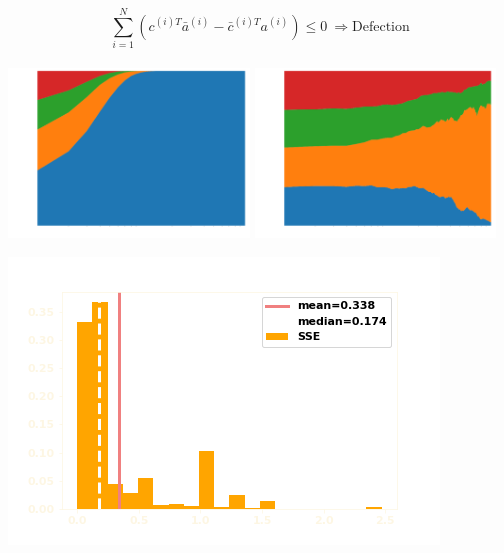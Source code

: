 \documentclass{beamer}
\begin{document}
\begin{frame}
    \begin{center}
    \[\sum_{i=1} ^ N (c^{(i)T} \bar{a}^{(i)} - \bar{c}^{(i)T} a^{(i)}) \leq 0 \ \Rightarrow \text{Defection}\] \\ \vspace{.5cm}
    \pause
    \includegraphics[width=0.48\textwidth]{static/population_defection_takes_over.png}\hspace{6pt}
    \includegraphics[width=0.48\textwidth]{static/population_defection_fails.png}\vspace{10pt}

    \end{center}
\end{frame}


\begin{frame}
    \begin{center}
    
    \end{center}
\end{frame}

\begin{frame}
    \begin{center}
    \includegraphics[width=.8\textwidth]{static/best_respones_sserror.png}
    \end{center}
\end{frame}
\end{document}
